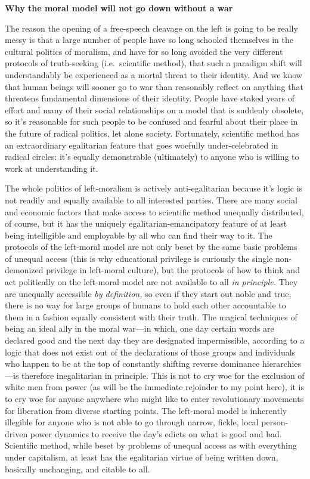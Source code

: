 \documentclass[a4paper,12pt,margin=.5in]{article}
\begin{document}
\textbf{Why the moral model will not go down without a war}

The reason the opening of a free-speech cleavage on the left is going to
be really messy is that a large number of people have so long schooled
themselves in the cultural politics of moralism, and have for so long
avoided the very different protocols of truth-seeking (i.e.~scientific
method), that such a paradigm shift will understandably be experienced
as a mortal threat to their identity. And we know that human beings will
sooner go to war than reasonably reflect on anything that threatens
fundamental dimensions of their identity. People have staked years of
effort and many of their social relationships on a model that is
suddenly obsolete, so it's reasonable for such people to be confused and
fearful about their place in the future of radical politics, let alone
society. Fortunately, scientific method has an extraordinary egalitarian
feature that goes woefully under-celebrated in radical circles: it's
equally demonstrable (ultimately) to anyone who is willing to work at
understanding it.

The whole politics of left-moralism is actively anti-egalitarian because
it's logic is not readily and equally available to all interested
parties. There are many social and economic factors that make access to
scientific method unequally distributed, of course, but it has the
uniquely egalitarian-emancipatory feature of at least being intelligible
and employable by all who can find their way to it. The protocols of the
left-moral model are not only beset by the same basic problems of
unequal access (this is why educational privilege is curiously the
single non-demonized privilege in left-moral culture), but the protocols
of how to think and act politically on the left-moral model are not
available to all \emph{in principle.} They are unequally accessible
\emph{by definition,} so even if they start out noble and true, there is
no way for large groups of humans to hold each other accountable to them
in a fashion equally consistent with their truth. The magical techniques
of being an ideal ally in the moral war---in which, one day certain
words are declared good and the next day they are designated
impermissible, according to a logic that does not exist out of the
declarations of those groups and individuals who happen to be at the top
of constantly shifting reverse dominance hierarchies---is therefore
inegalitarian in principle. This is not to cry woe for the exclusion of
white men from power (as will be the immediate rejoinder to my point
here), it is to cry woe for anyone anywhere who might like to enter
revolutionary movements for liberation from diverse starting points. The
left-moral model is inherently illegible for anyone who is not able to
go through narrow, fickle, local person-driven power dynamics to receive
the day's edicts on what is good and bad. Scientific method, while beset
by problems of unequal access as with everything under capitalism, at
least has the egalitarian virtue of being written down, basically
unchanging, and citable to all.
\end{document}
